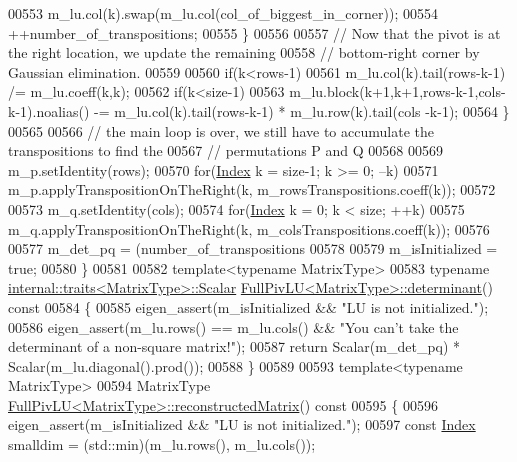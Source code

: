 \begin{DoxyCode}
00553       m\_lu.col(k).swap(m\_lu.col(col\_of\_biggest\_in\_corner));
00554       ++number\_of\_transpositions;
00555     \}
00556 
00557     \textcolor{comment}{// Now that the pivot is at the right location, we update the remaining}
00558     \textcolor{comment}{// bottom-right corner by Gaussian elimination.}
00559 
00560     \textcolor{keywordflow}{if}(k<rows-1)
00561       m\_lu.col(k).tail(rows-k-1) /= m\_lu.coeff(k,k);
00562     \textcolor{keywordflow}{if}(k<size-1)
00563       m\_lu.block(k+1,k+1,rows-k-1,cols-k-1).noalias() -= m\_lu.col(k).tail(rows-k-1) * m\_lu.row(k).tail(cols
      -k-1);
00564   \}
00565 
00566   \textcolor{comment}{// the main loop is over, we still have to accumulate the transpositions to find the}
00567   \textcolor{comment}{// permutations P and Q}
00568 
00569   m\_p.setIdentity(rows);
00570   \textcolor{keywordflow}{for}(\hyperlink{group___core___module_a554f30542cc2316add4b1ea0a492ff02}{Index} k = size-1; k >= 0; --k)
00571     m\_p.applyTranspositionOnTheRight(k, m\_rowsTranspositions.coeff(k));
00572 
00573   m\_q.setIdentity(cols);
00574   \textcolor{keywordflow}{for}(\hyperlink{group___core___module_a554f30542cc2316add4b1ea0a492ff02}{Index} k = 0; k < size; ++k)
00575     m\_q.applyTranspositionOnTheRight(k, m\_colsTranspositions.coeff(k));
00576 
00577   m\_det\_pq = (number\_of\_transpositions%
00578 
00579   m\_isInitialized = \textcolor{keyword}{true};
00580 \}
00581 
00582 \textcolor{keyword}{template}<\textcolor{keyword}{typename} MatrixType>
00583 \textcolor{keyword}{typename} \hyperlink{struct_eigen_1_1internal_1_1traits}{internal::traits<MatrixType>::Scalar} 
      \hyperlink{group___l_u___module_a71654e5c60a26407ecccfaa5b34bb0aa}{FullPivLU<MatrixType>::determinant}()\textcolor{keyword}{ const}
00584 \textcolor{keyword}{}\{
00585   eigen\_assert(m\_isInitialized && \textcolor{stringliteral}{"LU is not initialized."});
00586   eigen\_assert(m\_lu.rows() == m\_lu.cols() && \textcolor{stringliteral}{"You can't take the determinant of a non-square matrix!"});
00587   \textcolor{keywordflow}{return} Scalar(m\_det\_pq) * Scalar(m\_lu.diagonal().prod());
00588 \}
00589 
00593 \textcolor{keyword}{template}<\textcolor{keyword}{typename} MatrixType>
00594 MatrixType \hyperlink{group___l_u___module_a191a4f598b0c192a83ab48984e87ee51}{FullPivLU<MatrixType>::reconstructedMatrix}()\textcolor{keyword}{ const}
00595 \textcolor{keyword}{}\{
00596   eigen\_assert(m\_isInitialized && \textcolor{stringliteral}{"LU is not initialized."});
00597   \textcolor{keyword}{const} \hyperlink{group___core___module_a554f30542cc2316add4b1ea0a492ff02}{Index} smalldim = (std::min)(m\_lu.rows(), m\_lu.cols());

\end{DoxyCode}

